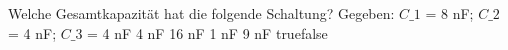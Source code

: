     {Welche Gesamtkapazität hat die folgende Schaltung? Gegeben: $C\_1$ = 8 nF; $C\_2$ = 4 nF; $C\_3$ = 4 nF}
    {4 nF}
    {16 nF}
    {1 nF}
    {9 nF}
    {true}{false}